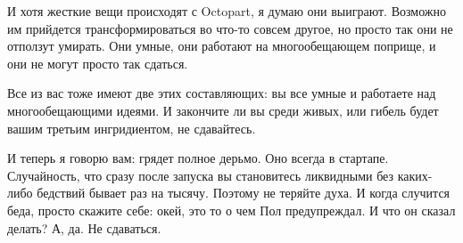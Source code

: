 \documentclass[ebook,12pt,oneside,openany]{memoir}
\begin{document}
И хотя жесткие вещи происходят с Octopart, я думаю они выиграют.
Возможно им прийдется трансформироваться во что-то совсем другое, но
просто так они не отползут умирать. Они умные, они работают на
многообещающем поприще, и они не могут просто так сдаться.

Все из вас тоже имеют две этих составляющих: вы все умные и работаете
над многообещающими идеями. И закончите ли вы среди живых, или гибель
будет вашим третьим ингридиентом, не сдавайтесь.

И теперь я говорю вам: грядет полное дерьмо. Оно всегда в стартапе.
Случайность, что сразу после запуска вы становитесь ликвидными без
каких-либо бедствий бывает раз на тысячу. Поэтому не теряйте духа. И
когда случится беда, просто скажите себе: окей, это то о чем Пол
предупреждал. И что он сказал делать? А, да. Не сдаваться.
\end{document}
